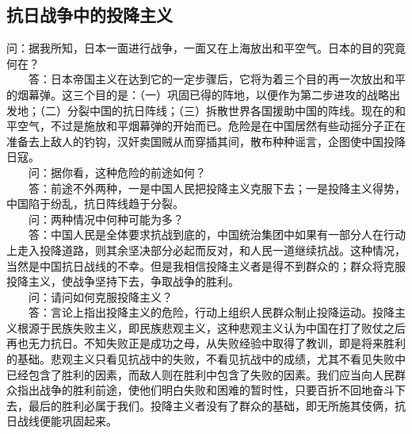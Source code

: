 \documentclass[cn,11pt,chinese]{elegantbook}
\def\myformat#1{\hfil\hfil #1}
\begin{document}
\subsection*{\myformat{抗日战争中的投降主义}}
问：据我所知，日本一面进行战争，一面又在上海放出和平空气。日本的目的究竟何在？\\
　　答：日本帝国主义在达到它的一定步骤后，它将为着三个目的再一次放出和平的烟幕弹。这三个目的是：（一）巩固已得的阵地，以便作为第二步进攻的战略出发地；（二）分裂中国的抗日阵线；（三）拆散世界各国援助中国的阵线。现在的和平空气，不过是施放和平烟幕弹的开始而已。危险是在中国居然有些动摇分子正在准备去上敌人的钓钩，汉奸卖国贼从而穿插其间，散布种种谣言，企图使中国投降日寇。\\
　　问：据你看，这种危险的前途如何？\\
　　答：前途不外两种，一是中国人民把投降主义克服下去；一是投降主义得势，中国陷于纷乱，抗日阵线趋于分裂。\\
　　问：两种情况中何种可能为多？\\
　　答：中国人民是全体要求抗战到底的，中国统治集团中如果有一部分人在行动上走入投降道路，则其余坚决部分必起而反对，和人民一道继续抗战。这种情况，当然是中国抗日战线的不幸。但是我相信投降主义者是得不到群众的；群众将克服投降主义，使战争坚持下去，争取战争的胜利。\\
　　问：请问如何克服投降主义？\\
　　答：言论上指出投降主义的危险，行动上组织人民群众制止投降运动。投降主义根源于民族失败主义，即民族悲观主义，这种悲观主义认为中国在打了败仗之后再也无力抗日。不知失败正是成功之母，从失败经验中取得了教训，即是将来胜利的基础。悲观主义只看见抗战中的失败，不看见抗战中的成绩，尤其不看见失败中已经包含了胜利的因素，而敌人则在胜利中包含了失败的因素。我们应当向人民群众指出战争的胜利前途，使他们明白失败和困难的暂时性，只要百折不回地奋斗下去，最后的胜利必属于我们。投降主义者没有了群众的基础，即无所施其伎俩，抗日战线便能巩固起来。\\
\end{document}
